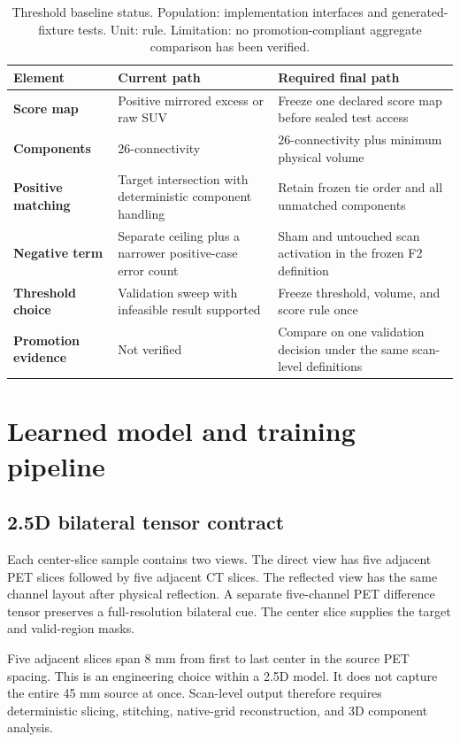 \documentclass[11pt]{article}
\begin{document}
\begin{table}[H]
\centering
\caption{Threshold baseline status. Population: implementation interfaces and generated-fixture tests. Unit: rule. Limitation: no promotion-compliant aggregate comparison has been verified.}
\label{tab:baseline-gap}
\begin{tabularx}{\textwidth}{>{\bfseries}p{} X X}
\toprule
Element & Current path & Required final path \\
\midrule
Score map & Positive mirrored excess or raw SUV & Freeze one declared score map before sealed test access \\
Components & 26-connectivity & 26-connectivity plus minimum physical volume \\
Positive matching & Target intersection with deterministic component handling & Retain frozen tie order and all unmatched components \\
Negative term & Separate ceiling plus a narrower positive-case error count & Sham and untouched scan activation in the frozen F2 definition \\
Threshold choice & Validation sweep with infeasible result supported & Freeze threshold, volume, and score rule once \\
Promotion evidence & Not verified & Compare on one validation decision under the same scan-level definitions \\
\bottomrule
\end{tabularx}
\end{table}

\section{Learned model and training pipeline}

\subsection{2.5D bilateral tensor contract}

Each center-slice sample contains two views. The direct view has five adjacent PET slices followed by five adjacent CT slices. The reflected view has the same channel layout after physical reflection. A separate five-channel PET difference tensor preserves a full-resolution bilateral cue. The center slice supplies the target and valid-region masks.

Five adjacent slices span 8 mm from first to last center in the source PET spacing. This is an engineering choice within a 2.5D model. It does not capture the entire 45 mm source at once. Scan-level output therefore requires deterministic slicing, stitching, native-grid reconstruction, and 3D component analysis.
\end{document}
